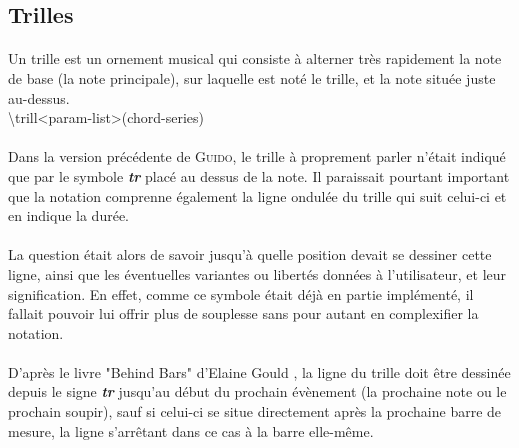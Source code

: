 \documentclass[a4paper,10pt,twocolumn]{article}
\newenvironment{code}
  {\fontfamily{pnc}\selectfont}{}
\begin{document}
\subsection{Trilles}


\paragraph{}
Un trille est \og{}un ornement musical qui consiste à alterner très rapidement la note de base (la note principale), sur laquelle est noté le trille, et la note située juste au-dessus\fg{}.
\\

\begin{code}
\textbackslash{}trill\textless{}param-list\textgreater{}(chord-series)
\end{code}

\paragraph{}
Dans la version précédente de \textsc{Guido}, le trille à proprement parler n'était indiqué que par le symbole \textit{\textbf{tr}} placé au dessus de la note. Il paraissait pourtant important que la notation comprenne également la ligne ondulée du trille qui suit celui-ci et en indique la durée.

\paragraph{}
La question était alors de savoir jusqu'à quelle position devait se dessiner cette ligne, ainsi que les éventuelles variantes ou libertés données à l'utilisateur, et leur signification. En effet, comme ce symbole était déjà en partie implémenté, il fallait pouvoir lui offrir plus de souplesse sans pour autant en complexifier la notation.

\paragraph{}
D'après le livre "Behind Bars" d'Elaine Gould \cite{ref2}, la ligne du trille doit être dessinée depuis le signe \textit{\textbf{tr}} jusqu'au début du prochain évènement (la prochaine note ou le prochain soupir), sauf si celui-ci se situe directement après la prochaine barre de mesure, la ligne s'arrêtant dans ce cas à la barre elle-même. 
\end{document}
